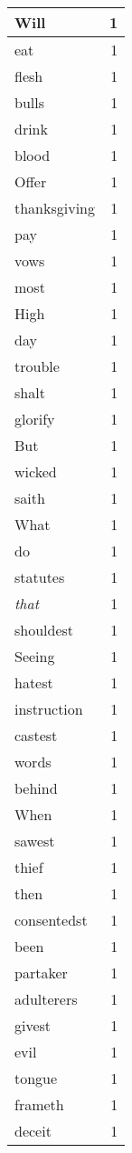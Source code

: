 \begin{center}
\begin{longtable}{l|r}
Will & 1 \\ \hline
eat & 1 \\ \hline
flesh & 1 \\ \hline
bulls & 1 \\ \hline
drink & 1 \\ \hline
blood & 1 \\ \hline
Offer & 1 \\ \hline
thanksgiving & 1 \\ \hline
pay & 1 \\ \hline
vows & 1 \\ \hline
most & 1 \\ \hline
High & 1 \\ \hline
day & 1 \\ \hline
trouble & 1 \\ \hline
shalt & 1 \\ \hline
glorify & 1 \\ \hline
But & 1 \\ \hline
wicked & 1 \\ \hline
saith & 1 \\ \hline
What & 1 \\ \hline
do & 1 \\ \hline
statutes & 1 \\ \hline
\emph{that} & 1 \\ \hline
shouldest & 1 \\ \hline
Seeing & 1 \\ \hline
hatest & 1 \\ \hline
instruction & 1 \\ \hline
castest & 1 \\ \hline
words & 1 \\ \hline
behind & 1 \\ \hline
When & 1 \\ \hline
sawest & 1 \\ \hline
thief & 1 \\ \hline
then & 1 \\ \hline
consentedst & 1 \\ \hline
been & 1 \\ \hline
partaker & 1 \\ \hline
adulterers & 1 \\ \hline
givest & 1 \\ \hline
evil & 1 \\ \hline
tongue & 1 \\ \hline
frameth & 1 \\ \hline
deceit & 1 \\ \hline

\end{longtable}
\end{center}
